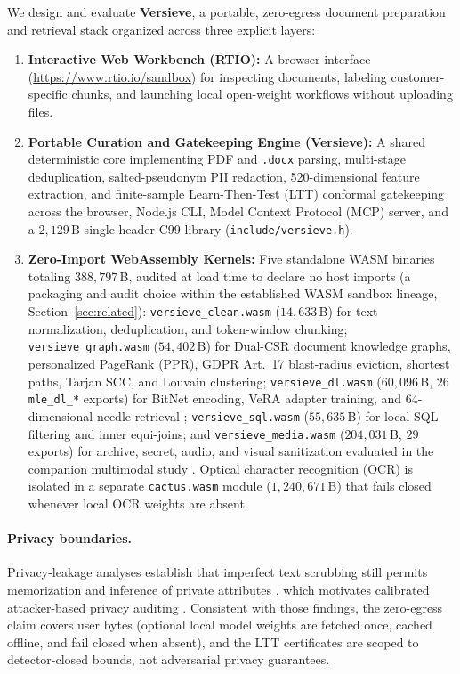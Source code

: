 \documentclass{article}
\begin{document}
We design and evaluate \textbf{Versieve}, a portable, zero-egress document preparation and retrieval stack organized across three explicit layers:
\begin{enumerate}
    \item \textbf{Interactive Web Workbench (RTIO):} A browser interface (\url{https://www.rtio.io/sandbox}) for inspecting documents, labeling customer-specific chunks, and launching local open-weight workflows without uploading files.
    \item \textbf{Portable Curation and Gatekeeping Engine (Versieve):} A shared deterministic core implementing PDF and \texttt{.docx} parsing, multi-stage deduplication, salted-pseudonym PII redaction, 520-dimensional feature extraction, and finite-sample Learn-Then-Test (LTT) conformal gatekeeping across the browser, Node.js CLI, Model Context Protocol (MCP) server, and a $2{,}129$\,B single-header C99 library (\texttt{include/versieve.h}).
    \item \textbf{Zero-Import WebAssembly Kernels:} Five standalone WASM binaries totaling $388{,}797$\,B, audited at load time to declare no host imports (a packaging and audit choice within the established WASM sandbox lineage, Section~\ref{sec:related}): \texttt{versieve\_clean.wasm} ($14{,}633$\,B) for text normalization, deduplication, and token-window chunking; \texttt{versieve\_graph.wasm} ($54{,}402$\,B) for Dual-CSR document knowledge graphs, personalized PageRank (PPR), GDPR Art.~17 blast-radius eviction, shortest paths, Tarjan SCC, and Louvain clustering; \texttt{versieve\_dl.wasm} ($60{,}096$\,B, $26$ \texttt{mle\_dl\_*} exports) for BitNet encoding, VeRA adapter training, and 64-dimensional needle retrieval \citep{wang2024bitnet,kopiczko2024vera,vaswani2017attention}; \texttt{versieve\_sql.wasm} ($55{,}635$\,B) for local SQL filtering and inner equi-joins; and \texttt{versieve\_media.wasm} ($204{,}031$\,B, $29$ exports) for archive, secret, audio, and visual sanitization evaluated in the companion multimodal study \citep{ardiyansyah2026multimodal}. Optical character recognition (OCR) is isolated in a separate \texttt{cactus.wasm} module ($1{,}240{,}671$\,B) that fails closed whenever local OCR weights are absent.
\end{enumerate}

\paragraph{Privacy boundaries.}
Privacy-leakage analyses establish that imperfect text scrubbing still permits memorization and inference of private attributes \citep{lukas2023pii,staab2024beyond}, which motivates calibrated attacker-based privacy auditing \citep{cpa2026auditing}. Consistent with those findings, the zero-egress claim covers user bytes (optional local model weights are fetched once, cached offline, and fail closed when absent), and the LTT certificates are scoped to detector-closed bounds, not adversarial privacy guarantees.
\end{document}
